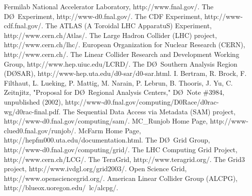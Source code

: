 \documentclass{revtex4}
\newcommand{\DO}{\mbox{D\O}}
\begin{document}
\begin{thebibliography}{0}
 Fermilab National Accelerator Laboratory, http://www.fnal.gov/.
 The \DO\ Experiment, http://www-d0.fnal.gov/.
 The CDF Experiment, http://www-cdf.fnal.gov/.
 The ATLAS (A Toroidal LHC ApparatuS) Experiment, http://www.cern.ch/Atlas/.
  The Large Hadron Collider (LHC) project, http://www.cern.ch/lhc/.
 European Organization for Nuclear Research (CERN), http://www.cern.ch/.
 The Linear Collider Research and Development Working Group, http://www.hep.uiuc.edu/LCRD/.
 The \DO\ Southern Analysis Region (\DO SAR), http://www-hep.uta.edu/d0-sar/d0-sar.html.
 I. Bertram, R. Brock, F. Filthaut, L. Lueking, P. Mattig, M. Narain, P. Lebrun, B. Thooris, J. Yu, C. Zeitnjitz, "Proposal for \DO\ Regional Analysis Centers," \DO\ Note \#3984, unpublished (2002), http://www-d0.fnal.gov/computing/D0Race/d0rac-wg/d0rac-final.pdf.
 The Sequential Data Access via Metadata (SAM) project, http://www-d0.fnal.gov/computing/sam/.
 MC\_Runjob Home Page, http://www-clued0.fnal.gov/runjob/.
 McFarm Home Page, http://hepfm000.uta.edu/documentation.html.
 The \DO\ Grid Group, http://www-d0.fnal.gov/computing/grid/.
 The LHC Computing Grid Project, http://www.cern.ch/LCG/.
 The TeraGrid, http://www.teragrid.org/.
 The Grid3 project, http://www.ivdgl.org/grid2003/.
 Open Science Grid, http://www.opensciencegrid.org/.
 American Linear Collider Group (ALCPG), http://blueox.uoregon.edu/~lc/alcpg/.
\end{thebibliography}
\end{document}
